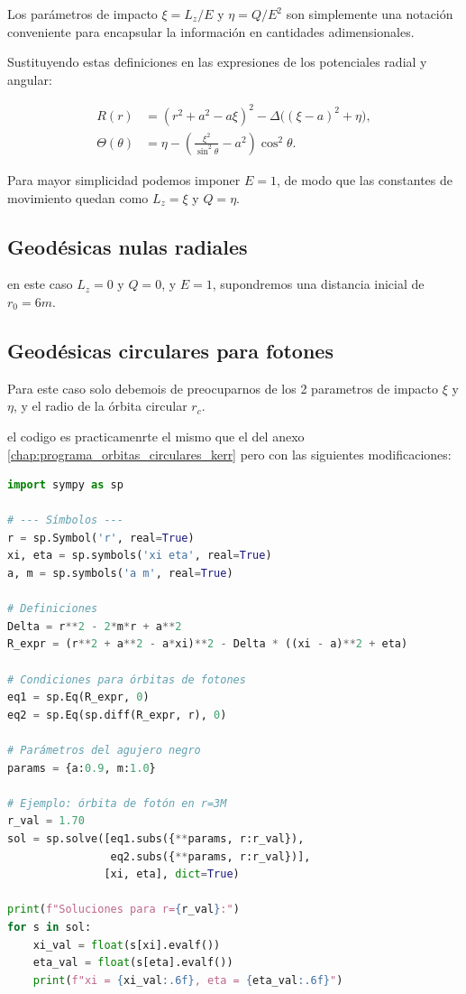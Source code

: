 Los parámetros de impacto \(\xi=L_z/E\) y \(\eta=Q/E^2\) son simplemente 
una notación conveniente para encapsular la información en cantidades adimensionales.

Sustituyendo estas definiciones en las expresiones de los potenciales radial y angular:

\begin{align}
R(r) &=  (r^2+a^2 - a\xi)^2 - \Delta\big((\xi - a)^2 + \eta \big) , \\
\Theta(\theta)  &=  \eta - \left( \frac{\xi^2}{\sin^2\theta} - a^2 \right)\cos^2\theta .
\end{align}

Para mayor simplicidad podemos imponer $E = 1$, de modo que las constantes de movimiento quedan como $L_z = \xi$ y $Q = \eta$.
\subsection{Geodésicas nulas radiales} 
en este caso $L_z = 0$ y $Q = 0$, y $E = 1$, supondremos una distancia inicial de $r_0 = 6m$.


\subsection{Geodésicas circulares para fotones}
Para este caso solo debemois de preocuparnos de los 2 parametros de impacto $\xi$ y $\eta$, y el radio de la órbita circular $r_c$.

el codigo es practicamenrte el mismo que el del anexo \ref{chap:programa_orbitas_circulares_kerr} pero con las siguientes modificaciones:


\begin{lstlisting}[language=Python, caption={Cálculo numérico de las constantes para órbitas circulares de fotones en Kerr}, label={lst:kerr_circular_orbits_photons}]
    import sympy as sp

# --- Símbolos ---
r = sp.Symbol('r', real=True)
xi, eta = sp.symbols('xi eta', real=True)
a, m = sp.symbols('a m', real=True)

# Definiciones
Delta = r**2 - 2*m*r + a**2
R_expr = (r**2 + a**2 - a*xi)**2 - Delta * ((xi - a)**2 + eta)

# Condiciones para órbitas de fotones
eq1 = sp.Eq(R_expr, 0)
eq2 = sp.Eq(sp.diff(R_expr, r), 0)

# Parámetros del agujero negro
params = {a:0.9, m:1.0}

# Ejemplo: órbita de fotón en r=3M
r_val = 1.70
sol = sp.solve([eq1.subs({**params, r:r_val}),
                eq2.subs({**params, r:r_val})],
               [xi, eta], dict=True)

print(f"Soluciones para r={r_val}:")
for s in sol:
    xi_val = float(s[xi].evalf())
    eta_val = float(s[eta].evalf())
    print(f"xi = {xi_val:.6f}, eta = {eta_val:.6f}")
\end{lstlisting}

